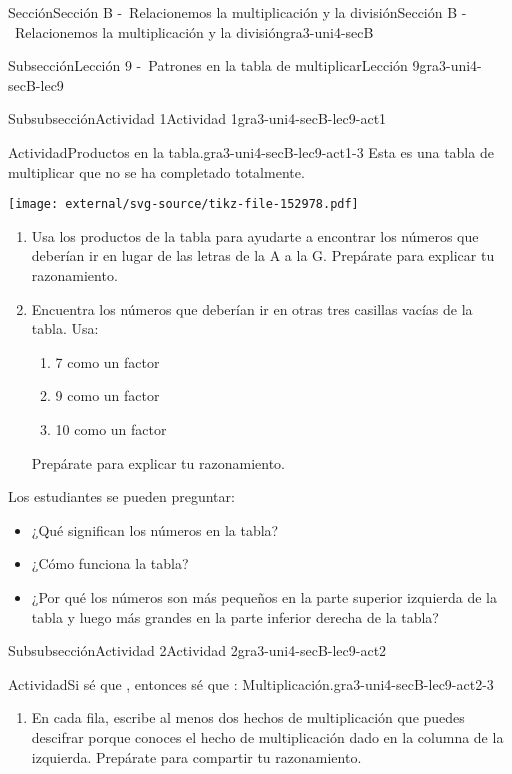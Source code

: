 \documentclass[twoside,14pt,]{extarticle}
\begin{document}
\begin{sectionptx}{Sección}{Sección B -~Relacionemos la multiplicación y la división}{}{Sección B -~Relacionemos la multiplicación y la división}{}{}{gra3-uni4-secB}
\begin{subsectionptx}{Subsección}{Lección 9 -~Patrones en la tabla de multiplicar}{}{Lección 9}{}{}{gra3-uni4-secB-lec9}
\typeout{************************************************}
%
\begin{subsubsectionptx}{Subsubsección}{Actividad 1}{}{Actividad 1}{}{}{gra3-uni4-secB-lec9-act1}
\begin{activity}{Actividad}{Productos en la tabla.}{gra3-uni4-secB-lec9-act1-3}%
Esta es una tabla de multiplicar que no se ha completado totalmente.%
\begin{image}{0}{1}{0}{}%
\texttt{[image: external/svg-source/tikz-file-152978.pdf]}
\end{image}%
%
\begin{enumerate}
\item{}Usa los productos de la tabla para ayudarte a encontrar los números que deberían ir en lugar de las letras de la A a la G. Prepárate para explicar tu razonamiento.%
\item{}Encuentra los números que deberían ir en otras tres casillas vacías de la tabla. Usa:%
%
\begin{enumerate}
\item{}7 como un factor%
\item{}9 como un factor%
\item{}10 como un factor%
\end{enumerate}
Prepárate para explicar tu razonamiento.%
\end{enumerate}
Los estudiantes se pueden preguntar:%
%
\begin{itemize}[label=\textbullet]
\item{}¿Qué significan los números en la tabla?%
\item{}¿Cómo funciona la tabla?%
\item{}¿Por qué los números son más pequeños en la parte superior izquierda de la tabla y luego más grandes en la parte inferior derecha de la tabla?%
\end{itemize}
\end{activity}%
\end{subsubsectionptx}
%
%
\typeout{************************************************}
\typeout{************************************************}
%
\begin{subsubsectionptx}{Subsubsección}{Actividad 2}{}{Actividad 2}{}{}{gra3-uni4-secB-lec9-act2}
\begin{activity}{Actividad}{Si sé que \textellipsis{}, entonces sé que \textellipsis{}: Multiplicación.}{gra3-uni4-secB-lec9-act2-3}%
%
\begin{enumerate}
\item{}En cada fila, escribe al menos dos hechos de multiplicación que puedes descifrar porque conoces el hecho de multiplicación dado en la columna de la izquierda. Prepárate para compartir tu razonamiento.%

\end{enumerate}
\end{activity}
\end{subsubsectionptx}
\end{subsectionptx}
\end{sectionptx}
\end{document}
